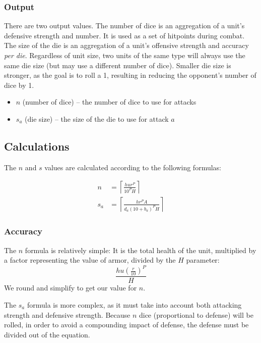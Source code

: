 \documentclass{article}
\begin{document}
\subsubsection{Output}

There are two output values.
The number of dice is an aggregation of a unit's defensive strength and number.
It is used as a set of hitpoints during combat.
The size of the die is an aggregation
of a unit's offensive strength and accuracy \emph{per die}.
Regardless of unit size,
two units of the same type will always use the same die size
(but may use a different number of dice).
Smaller die size is stronger,
as the goal is to roll a 1,
resulting in reducing the opponent's number of dice by 1.

\begin{itemize}
    \item $n$ (number of dice) -- the number of dice to use for attacks
    \item $s_a$ (die size) -- the size of the die to use for attack $a$
\end{itemize}

\subsection{Calculations}

The $n$ and $s$ values are calculated according to the following formulas:

\begin{align*}
    n   &=  
        \left\lceil
            \frac
                {h u r^P}
                {10^P H}
        \right\rceil \\
    s_a &=
        \left\lceil
            \frac
                {h r^P A}
                {d_a (10 + b_{a})^P H}
        \right\rceil
\end{align*}

\subsubsection{Accuracy}


The $n$ formula is relatively simple:
It is the total health of the unit,
multiplied by a factor representing the value of armor,
divided by the $H$ parameter:
\[
    \frac
        {h u (\frac{r}{10})^P}
        {H}
\]
We round and simplify to get our value for $n$.

The $s_a$ formula is more complex,
as it must take into account both attacking strength and defensive strength.
Because $n$ dice (proportional to defense) will be rolled,
in order to avoid a compounding impact of defense,
the defense must be divided out of the equation.
\end{document}
